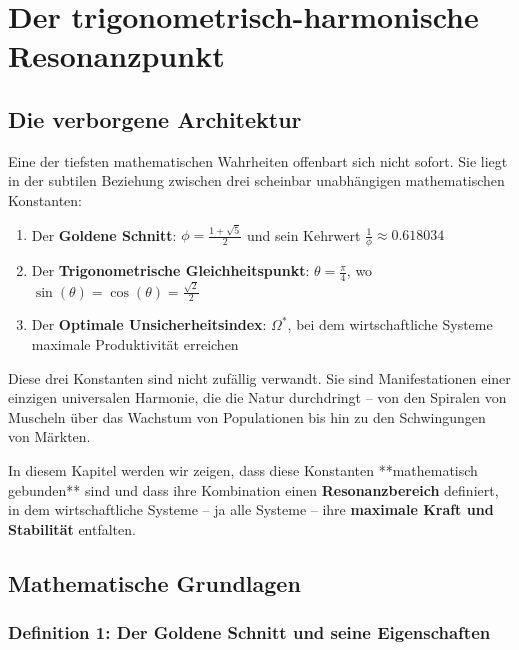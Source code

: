 \documentclass[a4paper,12pt,twoside]{report}
\theoremstyle{definition}
\begin{document}
\section{Der trigonometrisch-harmonische Resonanzpunkt}

\subsection{Die verborgene Architektur}

Eine der tiefsten mathematischen Wahrheiten offenbart sich nicht sofort. Sie liegt in der subtilen Beziehung zwischen drei scheinbar unabhängigen mathematischen Konstanten:

\begin{enumerate}
	\item Der \textbf{Goldene Schnitt}: $\phi = \frac{1+\sqrt{5}}{2}$ und sein Kehrwert $\frac{1}{\phi} \approx 0.618034$
	
	\item Der \textbf{Trigonometrische Gleichheitspunkt}: $\theta = \frac{\pi}{4}$, wo $\sin(\theta) = \cos(\theta) = \frac{\sqrt{2}}{2}$
	
	\item Der \textbf{Optimale Unsicherheitsindex}: $\Omega^*$, bei dem wirtschaftliche Systeme maximale Produktivität erreichen
\end{enumerate}

Diese drei Konstanten sind nicht zufällig verwandt. Sie sind Manifestationen einer einzigen universalen Harmonie, die die Natur durchdringt -- von den Spiralen von Muscheln über das Wachstum von Populationen bis hin zu den Schwingungen von Märkten.

In diesem Kapitel werden wir zeigen, dass diese Konstanten **mathematisch gebunden** sind und dass ihre Kombination einen \textbf{Resonanzbereich} definiert, in dem wirtschaftliche Systeme -- ja alle Systeme -- ihre \textbf{maximale Kraft und Stabilität} entfalten.

\subsection{Mathematische Grundlagen}

\subsubsection{Definition 1: Der Goldene Schnitt und seine Eigenschaften}
\end{document}
